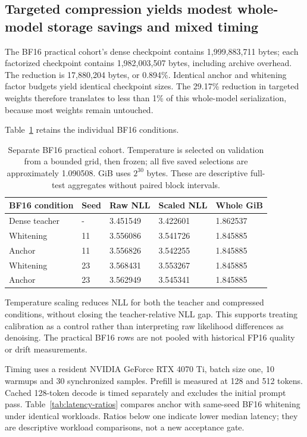 \documentclass[conference]{IEEEtran}
\begin{document}
\subsection{Targeted compression yields modest whole-model storage savings and mixed timing}
The BF16 practical cohort's dense checkpoint contains 1,999,883,711 bytes; each factorized checkpoint contains 1,982,003,507 bytes, including archive overhead. The reduction is 17,880,204 bytes, or 0.894\%. Identical anchor and whitening factor budgets yield identical checkpoint sizes. The 29.17\% reduction in targeted weights therefore translates to less than 1\% of this whole-model serialization, because most weights remain untouched.\par\smallskip
Table~\ref{tab:bf16-practical} retains the individual BF16 conditions.\par\smallskip
\begin{table}[t]
\centering
\caption{Separate BF16 practical cohort. Temperature is selected on validation
from a bounded grid, then frozen; all five saved selections are approximately
1.090508. GiB uses $2^{30}$ bytes. These are descriptive full-test aggregates
without paired block intervals.}
\label{tab:bf16-practical}
{\scriptsize\setlength{\tabcolsep}{2pt}
\noindent\begin{tabular}{@{}p{}p{}p{}p{}p{}@{}}\toprule
BF16 condition & Seed & Raw NLL & Scaled NLL & Whole GiB \\
\midrule
Dense teacher & - & 3.451549 & 3.422601 & 1.862537 \\
Whitening & 11 & 3.556086 & 3.541726 & 1.845885 \\
Anchor & 11 & 3.556826 & 3.542255 & 1.845885 \\
Whitening & 23 & 3.568431 & 3.553267 & 1.845885 \\
Anchor & 23 & 3.562949 & 3.545341 & 1.845885 \\
\bottomrule\end{tabular}}\par\medskip
\end{table}
Temperature scaling reduces NLL for both the teacher and compressed conditions, without closing the teacher-relative NLL gap. This supports treating calibration as a control rather than interpreting raw likelihood differences as denoising. The practical BF16 rows are not pooled with historical FP16 quality or drift measurements.\par\smallskip
Timing uses a resident NVIDIA GeForce RTX 4070 Ti, batch size one, 10 warmups and 30 synchronized samples. Prefill is measured at 128 and 512 tokens. Cached 128-token decode is timed separately and excludes the initial prompt pass. Table~\ref{tab:latency-ratios} compares anchor with same-seed BF16 whitening under identical workloads. Ratios below one indicate lower median latency; they are descriptive workload comparisons, not a new acceptance gate.\par\smallskip
\end{document}
